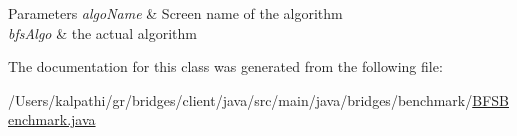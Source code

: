 \begin{DoxyParams}{Parameters}
{\em algo\+Name} & Screen name of the algorithm \\
\hline
{\em bfs\+Algo} & the actual algorithm \\
\hline
\end{DoxyParams}


The documentation for this class was generated from the following file\+:\begin{DoxyCompactItemize}
\item 
/\+Users/kalpathi/gr/bridges/client/java/src/main/java/bridges/benchmark/\mbox{\hyperlink{_b_f_s_benchmark_8java}{B\+F\+S\+Benchmark.\+java}}\end{DoxyCompactItemize}
